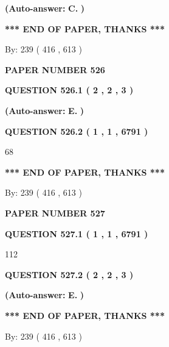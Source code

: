 \documentclass[12pt]{article}
\begin{document}
 
{\textbf{(Auto-answer:}}
{\textbf{\large{
C.}}}
{\textbf{)}}
 
 
   
   
   
   
\vspace{1.0in} 
{\textbf{\large{ *** END OF PAPER, THANKS *** }}} 
   
   
\hspace{1.0in} By: 
 239 ( 416 ,  613 )
   
   
   
   
\newpage 
\setcounter{page}{ 
   526001 } 
   
   
 {\textbf{ \Large{ PAPER NUMBER  526  }}}
   
   
   
   
  
  
{\textbf{\large{QUESTION
526.1 
 ( 2 , 2 , 3 )
}}}
 
 
{\textbf{(Auto-answer:}}
{\textbf{\large{
E.}}}
{\textbf{)}}
 
 
  
  
{\textbf{\large{QUESTION
526.2 
 ( 1 , 1 , 6791 )
}}}

68
   
   
   
   
\vspace{1.0in} 
{\textbf{\large{ *** END OF PAPER, THANKS *** }}} 
   
   
\hspace{1.0in} By: 
 239 ( 416 ,  613 )
   
   
   
   
\newpage 
\setcounter{page}{ 
   527001 } 
   
   
 {\textbf{ \Large{ PAPER NUMBER  527  }}}
   
   
   
   
  
  
{\textbf{\large{QUESTION
527.1 
 ( 1 , 1 , 6791 )
}}}

112
  
  
{\textbf{\large{QUESTION
527.2 
 ( 2 , 2 , 3 )
}}}
 
 
{\textbf{(Auto-answer:}}
{\textbf{\large{
E.}}}
{\textbf{)}}
 
 
   
   
   
   
\vspace{1.0in} 
{\textbf{\large{ *** END OF PAPER, THANKS *** }}} 
   
   
\hspace{1.0in} By: 
 239 ( 416 ,  613 )
   
   
   
\end{document}
